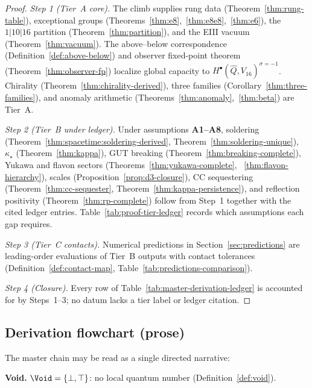 \begin{proof}
\emph{Step 1 (Tier~A core).}
The climb supplies rung data (Theorem~\ref{thm:rung-table}), exceptional groups
(Theorems~\ref{thm:e8},~\ref{thm:e8e8},~\ref{thm:e6}), the $1|10|16$ partition
(Theorem~\ref{thm:partition}), and the EIII vacuum (Theorem~\ref{thm:vacuum}).
The above--below correspondence (Definition~\ref{def:above-below}) and
observer fixed-point theorem (Theorem~\ref{thm:observer-fp}) localize global
capacity to $H^\bullet(\hat Q,V_{16})^{\sigma=-1}$. Chirality
(Theorem~\ref{thm:chirality-derived}), three families
(Corollary~\ref{thm:three-families}), and anomaly arithmetic
(Theorems~\ref{thm:anomaly},~\ref{thm:beta}) are Tier~A.

\emph{Step 2 (Tier~B under ledger).}
Under assumptions \textbf{A1--A8}, soldering
(Theorem~\ref{thm:spacetime:soldering-derived},
Theorem~\ref{thm:soldering-unique}), $\kappa_\star$ (Theorem~\ref{thm:kappa}),
GUT breaking (Theorem~\ref{thm:breaking-complete}),
Yukawa and flavon sectors (Theorems~\ref{thm:yukawa-complete},
~\ref{thm:flavon-hierarchy}), scales (Proposition~\ref{prop:d3-closure}),
CC sequestering (Theorem~\ref{thm:cc-sequester},
Theorem~\ref{thm:kappa-persistence}), and reflection positivity
(Theorem~\ref{thm:rp-complete}) follow from Step~1 together with the cited
ledger entries. Table~\ref{tab:proof-tier-ledger} records which assumptions
each gap requires.

\emph{Step 3 (Tier~C contacts).}
Numerical predictions in Section~\ref{sec:predictions} are leading-order
evaluations of Tier~B outputs with contact tolerances
(Definition~\ref{def:contact-map}, Table~\ref{tab:predictions-comparison}).

\emph{Step 4 (Closure).}
Every row of Table~\ref{tab:master-derivation-ledger} is accounted for by
Steps~1--3; no datum lacks a tier label or ledger citation.
\end{proof}

\subsection{Derivation flowchart (prose)}

The master chain may be read as a single directed narrative:

\medskip
\noindent\textbf{Void.}
$\Void=\{\bot,\top\}$: no local quantum number
(Definition~\ref{def:void}).

